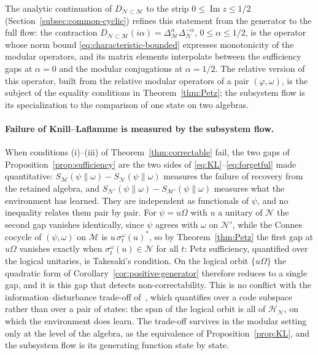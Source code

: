 \documentclass[a4paper,11pt]{article}
\theoremstyle{definition}
\newcommand{\mN}{\mathcal{N}}
\newcommand{\mH}{\mathcal{H}}
\newcommand{\mM}{\mathcal{M}}
\begin{document}
The analytic continuation of $D_{\mN\subset\mM}$ to the strip $0\le\operatorname{Im}z\le1/2$ (Section~\ref{subsec:common-cyclic}) refines this statement from the generator to the full flow: the contraction $D_{\mN\subset\mM}(i\alpha)=\Delta_{\mM}^{\alpha}\Delta_{\mN}^{-\alpha}$, $0\le\alpha\le1/2$, is the operator whose norm bound \eqref{eq:characteristic-bounded} expresses monotonicity of the modular operators, and its matrix elements interpolate between the sufficiency gaps at $\alpha=0$ and the modular conjugations at $\alpha=1/2$. The relative version of this operator, built from the relative modular operators of a pair $(\varphi,\omega)$, is the subject of the equality conditions in Theorem~\ref{thm:Petz}; the subsystem flow is its specialization to the comparison of one state on two algebras.


\paragraph{Failure of Knill--Laflamme is measured by the subsystem flow.}
When conditions (i)--(iii) of Theorem~\ref{thm:correctable} fail, the two gaps of Proposition~\ref{prop:sufficiency}  are the two sides of \eqref{eq:KL}--\eqref{eq:forgetful} made quantitative: $S_{\mM}(\psi\|\omega)-S_{\mN}(\psi\|\omega)$ measures the failure of recovery from the retained algebra, and $S_{\mN'}(\psi\|\omega)-S_{\mM'}(\psi\|\omega)$ measures what the environment has learned. They are independent as functionals of $\psi$, and no inequality relates them pair by pair. For $\psi=u\Omega$ with $u$ a unitary of $\mN$ the second gap vanishes identically, since $\psi$ agrees with $\omega$ on $\mN'$, while the Connes cocycle of $(\psi,\omega)$ on $\mM$ is $u\,\sigma^\omega_t(u)^*$, so by Theorem~\ref{thm:Petz} the first gap at $u\Omega$ vanishes exactly when $\sigma^\omega_t(u)\in\mN$ for all $t$: Petz sufficiency, quantified over the logical unitaries, is Takesaki's condition. On the logical orbit $\{u\Omega\}$ the quadratic form of Corollary~\ref{cor:positive-generator} therefore reduces to a single gap, and it is this gap that detects non-correctability. This is no conflict with the information--disturbance trade-off of~\cite{KretschmannSchlingemannWerner2008}, which quantifies over a code subspace rather than over a pair of states: the span of the logical orbit is all of $\mH_{\mN}$, on which the environment does learn. The trade-off survives in the modular setting only at the level of the algebra, as the equivalence of Proposition~\ref{prop:KL}, and the subsystem flow is its generating function state by state.
\end{document}
